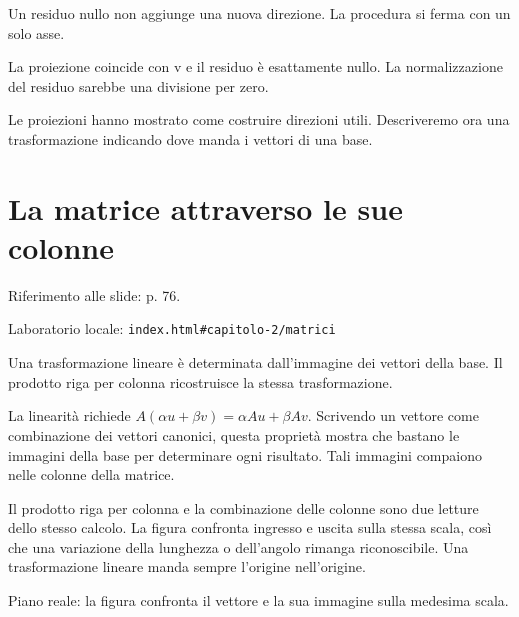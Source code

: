 Un residuo nullo non aggiunge una nuova direzione. La procedura si ferma con un solo asse.\par



La proiezione coincide con v e il residuo è esattamente nullo. La normalizzazione del residuo sarebbe una divisione per zero.\par


Le proiezioni hanno mostrato come costruire direzioni utili. Descriveremo ora una trasformazione indicando dove manda i vettori di una base.\par



\Needspace{.43\textheight}
\section{La matrice attraverso le sue colonne}
\label{c2-matrici}

{\sffamily\small\color{Ink!70} Riferimento alle slide: p. 76.\par}

{\sffamily\small\color{Ink!70} Laboratorio locale: \nolinkurl{index.html#capitolo-2/matrici}\par}

Una trasformazione lineare è determinata dall'immagine dei vettori della base. Il prodotto riga per colonna ricostruisce la stessa trasformazione.\par

La linearità richiede \(A(\alpha u+\beta v)=\alpha Au+\beta Av\). Scrivendo un vettore come combinazione dei vettori canonici, questa proprietà mostra che bastano le immagini della base per determinare ogni risultato. Tali immagini compaiono nelle colonne della matrice.\par

Il prodotto riga per colonna e la combinazione delle colonne sono due letture dello stesso calcolo. La figura confronta ingresso e uscita sulla stessa scala, così che una variazione della lunghezza o dell'angolo rimanga riconoscibile. Una trasformazione lineare manda sempre l'origine nell'origine.\par



Piano reale: la figura confronta il vettore e la sua immagine sulla medesima scala.\par


